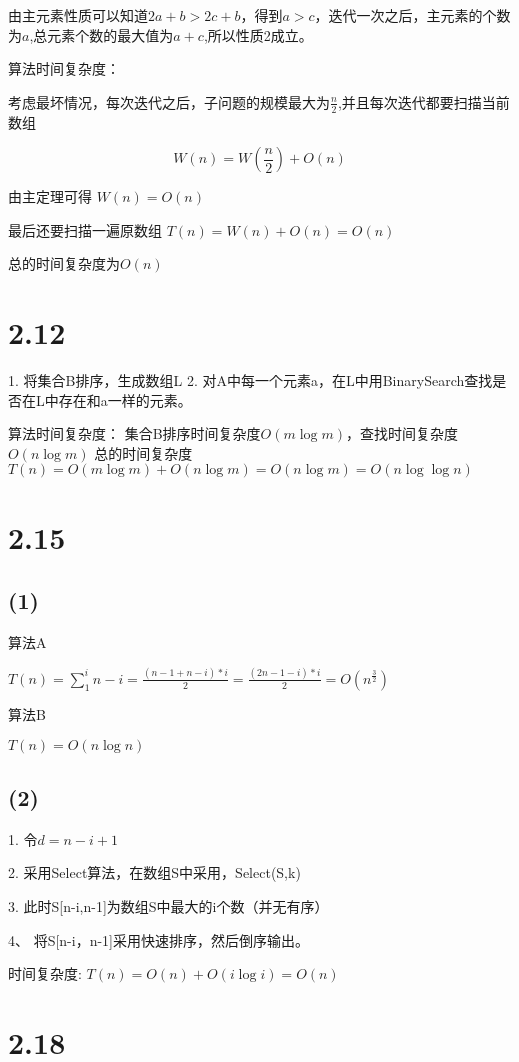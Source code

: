 \documentclass[a4paper]{article}
\begin{document}
		由主元素性质可以知道$2a+b > 2c+ b$，得到$a>c$，迭代一次之后，主元素的个数为$a$,总元素个数的最大值为$a+c$,所以性质2成立。

	算法时间复杂度：

	考虑最坏情况，每次迭代之后，子问题的规模最大为$\frac{n}{2}$,并且每次迭代都要扫描当前数组

	$$W(n)=W(\frac{n}{2})+O(n)$$

	由主定理可得 $W(n) = O(n)$

	最后还要扫描一遍原数组 $T(n) = W(n) +O(n) =O(n)$

	总的时间复杂度为$O(n)$

\section{2.12}
1. 将集合B排序，生成数组L
2. 对A中每一个元素a，在L中用BinarySearch查找是否在L中存在和a一样的元素。

算法时间复杂度：
	集合B排序时间复杂度$O(m \log m)$，查找时间复杂度$O(n \log m)$
	总的时间复杂度$T(n)=O(m \log m) + O(n \log m) = O(n \log m) =O (n \log \log n)$

\section{2.15}
\subsection*{(1)}
算法A 

$T(n) = \sum_{1}^{i}{n-i}=\frac{(n-1+n-i)*i}{2}=\frac{(2n-1-i)*i}{2}=O(n^{\frac{3}{2}})$

算法B

$T(n) = O(n \log n )$
\subsection*{(2)}

1. 令$d=n-i+1$

2. 采用Select算法，在数组S中采用，Select(S,k)

3. 此时S[n-i,n-1]为数组S中最大的i个数（并无有序）

4、 将S[n-i，n-1]采用快速排序，然后倒序输出。

时间复杂度:
	$T(n) = O(n)+O(i\log i) = O(n)$

\section*{2.18}
\end{document}

